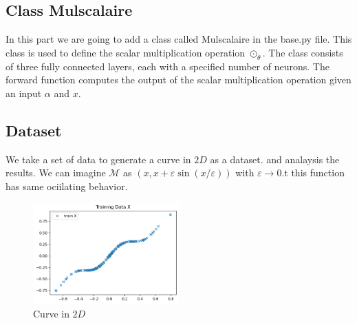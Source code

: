 \documentclass{report}
\begin{document}
        \subsection{Class Mulscalaire}

        In this part we are going to add a class called Mulscalaire 
        in the base.py file. This class is used to define the scalar
        multiplication operation $\odot_\theta$. The class consists of
        three fully connected layers, each with a specified number of
        neurons. The forward function computes the output of the scalar
        multiplication operation given an input $\alpha$ and $x$. 



        \subsection{Dataset}
        We take a set of data to generate a curve in $2D$ as a dataset.
        and analaysis the results. We can imagine $\mathcal{M}$ as 
        $(x, x+\varepsilon \sin (x / \varepsilon))$ with $\varepsilon \rightarrow 0$.t
        this function has same ociilating behavior.
        \begin{figure}[h!]
            \centering
            \includegraphics[width=0.5\textwidth]{curve.png}
            \caption{Curve in $2D$}
            \label{fig:curve}
            \end{figure}
\end{document}
